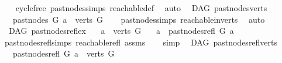 \begin{isabellebody}
%
\isadelimproof
\ \ %
\endisadelimproof
%
\isatagproof
{}\isamarkupfalse%
\ cycle{\isacharunderscore}{\kern0pt}free\ past{\isacharunderscore}{\kern0pt}nodes{\isachardot}{\kern0pt}simps\ reachable{\isacharunderscore}{\kern0pt}def\ \isamarkupfalse%
\ auto%
\endisatagproof
{\isafoldproof}%
%
\isadelimproof
\isanewline
%
\endisadelimproof
\isanewline
{}\isamarkupfalse%
\ {\isacharparenleft}{\kern0pt}\ DAG{\isacharparenright}{\kern0pt}\ past{\isacharunderscore}{\kern0pt}nodes{\isacharunderscore}{\kern0pt}verts{\isacharcolon}{\kern0pt}\ \isanewline
\ \ \ {\isachardoublequoteopen}past{\isacharunderscore}{\kern0pt}nodes\ G\ a\ {\isasymsubseteq}\ verts\ G{\isachardoublequoteclose}\isanewline
%
\isadelimproof
\ \ %
\endisadelimproof
%
\isatagproof
{}\isamarkupfalse%
\ past{\isacharunderscore}{\kern0pt}nodes{\isachardot}{\kern0pt}simps\ reachable{}{\isacharunderscore}{\kern0pt}in{\isacharunderscore}{\kern0pt}verts\ \isamarkupfalse%
\ auto%
\endisatagproof
{\isafoldproof}%
%
\isadelimproof
\isanewline
%
\endisadelimproof
\isanewline
{}\isamarkupfalse%
\ {\isacharparenleft}{\kern0pt}\ DAG{\isacharparenright}{\kern0pt}\ past{\isacharunderscore}{\kern0pt}nodes{\isacharunderscore}{\kern0pt}refl{\isacharunderscore}{\kern0pt}ex{\isacharcolon}{\kern0pt}\isanewline
\ \ \ {\isachardoublequoteopen}a\ {\isasymin}\ verts\ G{\isachardoublequoteclose}\isanewline
\ \ \ {\isachardoublequoteopen}a\ {\isasymin}\ past{\isacharunderscore}{\kern0pt}nodes{\isacharunderscore}{\kern0pt}refl\ G\ a{\isachardoublequoteclose}\isanewline
%
\isadelimproof
\ \ %
\endisadelimproof
%
\isatagproof
{}\isamarkupfalse%
\ past{\isacharunderscore}{\kern0pt}nodes{\isacharunderscore}{\kern0pt}refl{\isachardot}{\kern0pt}simps\ reachable{\isacharunderscore}{\kern0pt}refl\ assms\isanewline
\ \ \isamarkupfalse%
\ simp%
\endisatagproof
{\isafoldproof}%
%
\isadelimproof
\isanewline
%
\endisadelimproof
\isanewline
{}\isamarkupfalse%
\ {\isacharparenleft}{\kern0pt}\ DAG{\isacharparenright}{\kern0pt}\ past{\isacharunderscore}{\kern0pt}nodes{\isacharunderscore}{\kern0pt}refl{\isacharunderscore}{\kern0pt}verts{\isacharcolon}{\kern0pt}\ \isanewline
\ \ \ {\isachardoublequoteopen}past{\isacharunderscore}{\kern0pt}nodes{\isacharunderscore}{\kern0pt}refl\ G\ a\ {\isasymsubseteq}\ verts\ G{\isachardoublequoteclose}\isanewline
%
\isadelimproof
\ \ %
\endisadelimproof

\end{isabellebody}
